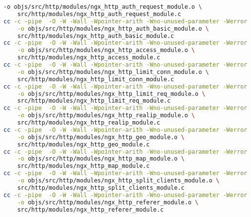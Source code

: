 \begin{lstlisting}[language=bash]
	-o objs/src/http/modules/ngx_http_auth_request_module.o \
	src/http/modules/ngx_http_auth_request_module.c
cc -c -pipe  -O -W -Wall -Wpointer-arith -Wno-unused-parameter -Werror -g  -I src/core -I src/event -I src/event/modules -I src/os/unix -I objs -I src/http -I src/http/modules \
	-o objs/src/http/modules/ngx_http_auth_basic_module.o \
	src/http/modules/ngx_http_auth_basic_module.c
cc -c -pipe  -O -W -Wall -Wpointer-arith -Wno-unused-parameter -Werror -g  -I src/core -I src/event -I src/event/modules -I src/os/unix -I objs -I src/http -I src/http/modules \
	-o objs/src/http/modules/ngx_http_access_module.o \
	src/http/modules/ngx_http_access_module.c
cc -c -pipe  -O -W -Wall -Wpointer-arith -Wno-unused-parameter -Werror -g  -I src/core -I src/event -I src/event/modules -I src/os/unix -I objs -I src/http -I src/http/modules \
	-o objs/src/http/modules/ngx_http_limit_conn_module.o \
	src/http/modules/ngx_http_limit_conn_module.c
cc -c -pipe  -O -W -Wall -Wpointer-arith -Wno-unused-parameter -Werror -g  -I src/core -I src/event -I src/event/modules -I src/os/unix -I objs -I src/http -I src/http/modules \
	-o objs/src/http/modules/ngx_http_limit_req_module.o \
	src/http/modules/ngx_http_limit_req_module.c
cc -c -pipe  -O -W -Wall -Wpointer-arith -Wno-unused-parameter -Werror -g  -I src/core -I src/event -I src/event/modules -I src/os/unix -I objs -I src/http -I src/http/modules \
	-o objs/src/http/modules/ngx_http_realip_module.o \
	src/http/modules/ngx_http_realip_module.c
cc -c -pipe  -O -W -Wall -Wpointer-arith -Wno-unused-parameter -Werror -g  -I src/core -I src/event -I src/event/modules -I src/os/unix -I objs -I src/http -I src/http/modules \
	-o objs/src/http/modules/ngx_http_geo_module.o \
	src/http/modules/ngx_http_geo_module.c
cc -c -pipe  -O -W -Wall -Wpointer-arith -Wno-unused-parameter -Werror -g  -I src/core -I src/event -I src/event/modules -I src/os/unix -I objs -I src/http -I src/http/modules \
	-o objs/src/http/modules/ngx_http_map_module.o \
	src/http/modules/ngx_http_map_module.c
cc -c -pipe  -O -W -Wall -Wpointer-arith -Wno-unused-parameter -Werror -g  -I src/core -I src/event -I src/event/modules -I src/os/unix -I objs -I src/http -I src/http/modules \
	-o objs/src/http/modules/ngx_http_split_clients_module.o \
	src/http/modules/ngx_http_split_clients_module.c
cc -c -pipe  -O -W -Wall -Wpointer-arith -Wno-unused-parameter -Werror -g  -I src/core -I src/event -I src/event/modules -I src/os/unix -I objs -I src/http -I src/http/modules \
	-o objs/src/http/modules/ngx_http_referer_module.o \
	src/http/modules/ngx_http_referer_module.c

\end{lstlisting}
